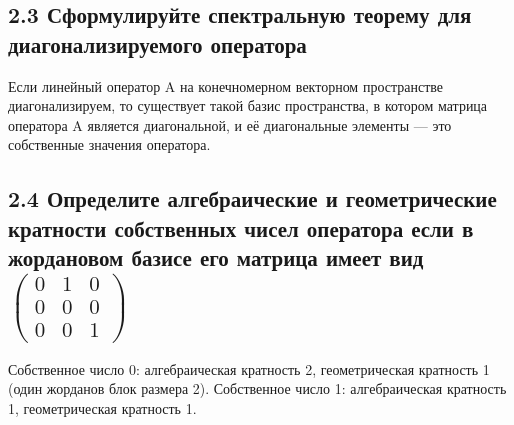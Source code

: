 \documentclass{article}
\begin{document}
\subsection*{2.3 Сформулируйте спектральную теорему для диагонализируемого оператора}
Если линейный оператор A на конечномерном векторном пространстве диагонализируем, то существует такой базис пространства, в котором матрица оператора A является диагональной, и её диагональные элементы — это собственные значения оператора.

\subsection*{2.4 Определите алгебраические и геометрические кратности собственных чисел оператора если в жордановом базисе его матрица имеет вид \( \begin{pmatrix} 0 & 1 & 0 \\ 0 & 0 & 0 \\ 0 & 0 & 1 \end{pmatrix} \)}
Собственное число 0: алгебраическая кратность 2, геометрическая кратность 1 (один жорданов блок размера 2).
Собственное число 1: алгебраическая кратность 1, геометрическая кратность 1.
\end{document}
